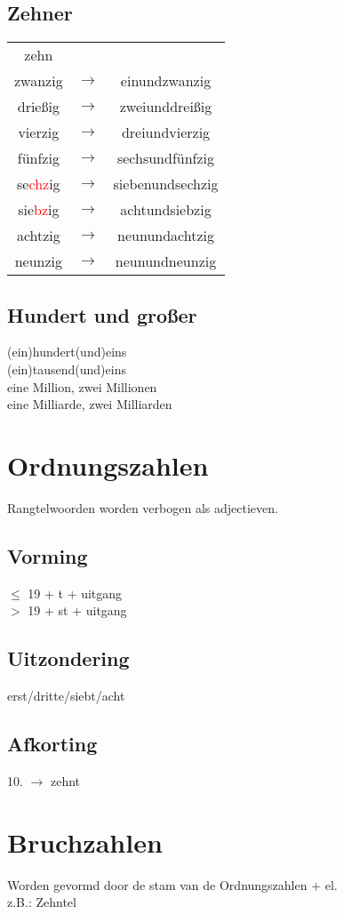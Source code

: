 \documentclass[main.tex]{subfiles}
\begin{document}
\begin{minipage}{0,5\textwidth}
\subsection{Zehner}
\begin{tabular}{ccc}
zehn &  &  \\ 
zwanzig & $\rightarrow$ & einundzwanzig \\ 
drießig & $\rightarrow$ & zweiunddreißig \\ 
vierzig & $\rightarrow$ & dreiundvierzig \\ 
fünfzig & $\rightarrow$ & sechsundfünfzig \\ 
se\textcolor{red}{chz}ig & $\rightarrow$ & siebenundsechzig \\ 
sie\textcolor{red}{bz}ig & $\rightarrow$ & achtundsiebzig \\ 
achtzig & $\rightarrow$ & neunundachtzig \\ 

neunzig & $\rightarrow$ & neunundneunzig \\ 

\end{tabular} 
\end{minipage}
\subsection{Hundert und großer}
(ein)hundert(und)eins\\
(ein)tausend(und)eins\\
eine Million, zwei Millionen\\
eine Milliarde, zwei Milliarden
\section{Ordnungszahlen}
Rangtelwoorden worden verbogen als adjectieven.
\subsection{Vorming}
$\leq$ 19 + t + uitgang\\
$>$ 19 + st + uitgang\\
\subsection{Uitzondering}
erst/dritte/siebt/acht
\subsection{Afkorting}
10. $\rightarrow$ zehnt

\section{Bruchzahlen}
Worden gevormd door de stam van de Ordnungszahlen + el.\\
z.B.: Zehntel
\end{document}
